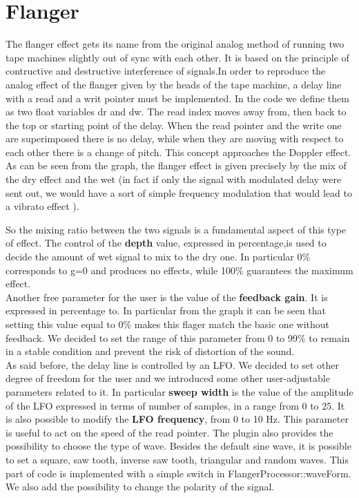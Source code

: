\section{Flanger}
The flanger effect gets its name from the original analog method of running two tape machines slightly out of sync with each other. It is based on the principle of contructive and destructive interference of signals.In order to reproduce the analog effect of the flanger given by the heads of the tape machine, a delay line with a read and a writ pointer must be implemented. In the code we define them as two float variables dr and dw. The read index moves away from, then back to the top or starting point of the delay. When the read pointer and the write one are superimposed there is no delay, while when they are moving with respect to each other there is a change of pitch. This concept approaches the Doppler effect. As can be seen from the graph, the flanger effect is given precisely by the mix of the dry effect and the wet (in fact if only the signal with modulated delay were sent out, we would have a sort of simple frequency modulation that would lead to a vibrato effect ).\par
So the mixing ratio between the two signals is a fundamental aspect of this type of effect. The control of the \textbf{depth} value, expressed in percentage,is used to decide the amount of wet signal to mix to the dry one. In particular 0\% corresponds to g=0 and produces no effects, while 100\% guarantees the maximum effect.\\
Another free parameter for the user is the value of the \textbf{feedback gain}. It is expressed in percentage to. In particular from the graph it can be seen that setting this value equal to 0\% makes this flager match the basic one without feedback. We decided to set the range of this parameter from 0 to 99\% to remain in a stable condition and prevent the risk of distortion of the sound.\\
As said before, the delay line is controlled by an LFO. We decided to set other degree of freedom for the user and we introduced some other user-adjustable parameters related to it. In particular \textbf{sweep width} is the value of the amplitude of the LFO expressed in terms of number of samples, in a range from  0 to 25. It is also possible to modify the \textbf{LFO frequency}, from 0 to 10 Hz. This parameter is useful to act on the speed of the read pointer. The plugin also provides the possibility to choose the type of wave. Besides the default sine wave, it is possible to set a square, saw tooth, inverse saw tooth, triangular and random waves. This part of code is implemented with a simple switch in FlangerProcessor::waveForm.
We also add the possibility to change the polarity of the signal.







